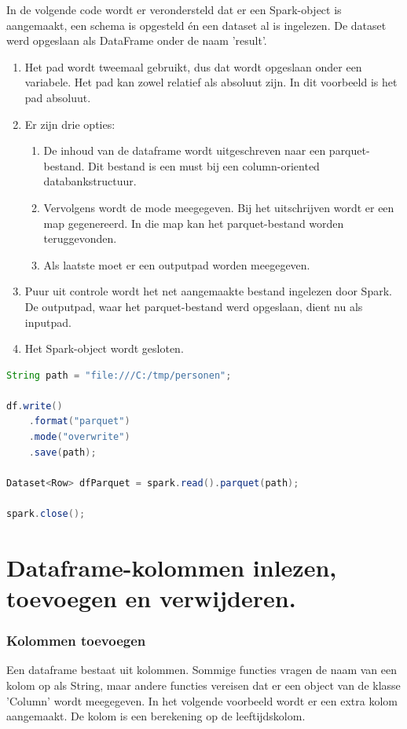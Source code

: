 \documentclass[a4paper,10pt,twoside]{report}
\begin{document}
In de volgende code wordt er verondersteld dat er een Spark-object is aangemaakt, een schema is opgesteld én een dataset al is ingelezen. De dataset werd opgeslaan als DataFrame onder de naam 'result'.

\begin{enumerate}
	\item Het pad wordt tweemaal gebruikt, dus dat wordt opgeslaan onder een variabele. Het pad kan zowel relatief als absoluut zijn. In dit voorbeeld is het pad absoluut.
	\item Er zijn drie opties:
	\begin{enumerate}
		\item De inhoud van de dataframe wordt uitgeschreven naar een parquet-bestand. Dit bestand is een must bij een column-oriented databankstructuur.
		\item Vervolgens wordt de mode meegegeven. Bij het uitschrijven wordt er een map gegenereerd. In die map kan het parquet-bestand worden teruggevonden.
		\item Als laatste moet er een outputpad worden meegegeven. 
	\end{enumerate}
	\item Puur uit controle wordt het net aangemaakte bestand ingelezen door Spark. De outputpad, waar het parquet-bestand werd opgeslaan, dient nu als inputpad.
	\item Het Spark-object wordt gesloten.
\end{enumerate}

\begin{lstlisting}[language=Java]
String path = "file:///C:/tmp/personen";

df.write()
	.format("parquet")
	.mode("overwrite")
	.save(path);
	
Dataset<Row> dfParquet = spark.read().parquet(path);

spark.close();
\end{lstlisting}

\section{Dataframe-kolommen inlezen, toevoegen en verwijderen.}

\subsubsection{Kolommen toevoegen}
Een dataframe bestaat uit kolommen. Sommige functies vragen de naam van een kolom op als String, maar andere functies vereisen dat er een object van de klasse 'Column' wordt meegegeven. In het volgende voorbeeld wordt er een extra kolom aangemaakt. De kolom is een berekening op de leeftijdskolom. 
\end{document}
